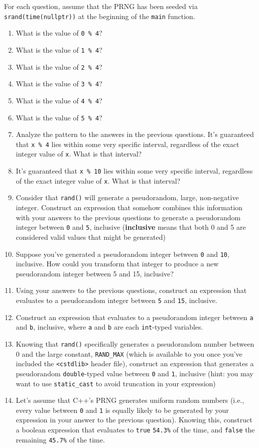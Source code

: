 \documentclass{article}
\begin{document}
For each question, assume that the PRNG has been seeded via \texttt{srand(time(nullptr))} at the beginning of the \texttt{main} function.

\begin{enumerate}
    \item What is the value of \texttt{0 \% 4}?
    \item What is the value of \texttt{1 \% 4}?
    \item What is the value of \texttt{2 \% 4}?
    \item What is the value of \texttt{3 \% 4}?
    \item What is the value of \texttt{4 \% 4}?
    \item What is the value of \texttt{5 \% 4}?
    \item Analyze the pattern to the answers in the previous questions. It's guaranteed that \texttt{x \% 4} lies within some very specific interval, regardless of the exact integer value of \texttt{x}. What is that interval?
    \item It's guaranteed that \texttt{x \% 10} lies within some very specific interval, regardless of the exact integer value of \texttt{x}. What is that interval?
    \item Consider that \texttt{rand()} will generate a pseudorandom, large, non-negative integer. Construct an expression that somehow combines this information with your answers to the previous questions to generate a pseudorandom integer between \texttt{0} and \texttt{5}, inclusive (\textbf{inclusive} means that both 0 and 5 are considered valid values that might be generated)
    \item Suppose you've generated a pseudorandom integer between \texttt{0} and \texttt{10}, inclusive. How could you transform that integer to produce a new pseudorandom integer between 5 and 15, inclusive?
    \item Using your answers to the previous questions, construct an expression that evaluates to a pseudorandom integer between \texttt{5} and \texttt{15}, inclusive.
    \item Construct an expression that evaluates to a pseudorandom integer between \texttt{a} and \texttt{b}, inclusive, where \texttt{a} and \texttt{b} are each \texttt{int}-typed variables.
    \item Knowing that \texttt{rand()} specifically generates a pseudorandom number between 0 and the large constant, \texttt{RAND\_MAX} (which is available to you once you've included the \texttt{<cstdlib>} header file), construct an expression that generates a pseudorandom \texttt{double}-typed value between \texttt{0} and \texttt{1}, inclusive (hint: you may want to use \texttt{static\_cast} to avoid truncation in your expression)
    \item Let's assume that C++'s PRNG generates uniform random numbers (i.e., every value between \texttt{0} and \texttt{1} is equally likely to be generated by your expression in your answer to the previous question). Knowing this, construct a boolean expression that evaluates to \texttt{true} \texttt{54.3\%} of the time, and \texttt{false} the remaining \texttt{45.7\%} of the time.
\end{enumerate}
\end{document}
